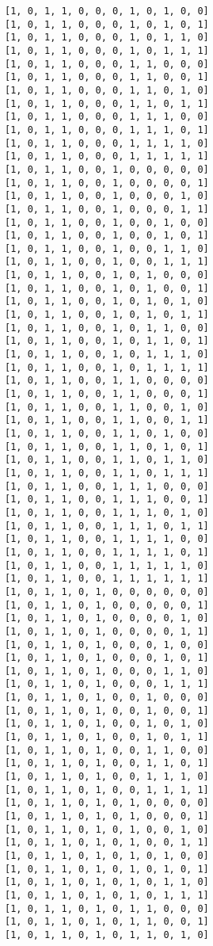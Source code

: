 \documentclass[11pt]{article}
\begin{document}
\begin{Verbatim}[commandchars=\\\{\}]
[1, 0, 1, 1, 0, 0, 0, 1, 0, 1, 0, 0]
[1, 0, 1, 1, 0, 0, 0, 1, 0, 1, 0, 1]
[1, 0, 1, 1, 0, 0, 0, 1, 0, 1, 1, 0]
[1, 0, 1, 1, 0, 0, 0, 1, 0, 1, 1, 1]
[1, 0, 1, 1, 0, 0, 0, 1, 1, 0, 0, 0]
[1, 0, 1, 1, 0, 0, 0, 1, 1, 0, 0, 1]
[1, 0, 1, 1, 0, 0, 0, 1, 1, 0, 1, 0]
[1, 0, 1, 1, 0, 0, 0, 1, 1, 0, 1, 1]
[1, 0, 1, 1, 0, 0, 0, 1, 1, 1, 0, 0]
[1, 0, 1, 1, 0, 0, 0, 1, 1, 1, 0, 1]
[1, 0, 1, 1, 0, 0, 0, 1, 1, 1, 1, 0]
[1, 0, 1, 1, 0, 0, 0, 1, 1, 1, 1, 1]
[1, 0, 1, 1, 0, 0, 1, 0, 0, 0, 0, 0]
[1, 0, 1, 1, 0, 0, 1, 0, 0, 0, 0, 1]
[1, 0, 1, 1, 0, 0, 1, 0, 0, 0, 1, 0]
[1, 0, 1, 1, 0, 0, 1, 0, 0, 0, 1, 1]
[1, 0, 1, 1, 0, 0, 1, 0, 0, 1, 0, 0]
[1, 0, 1, 1, 0, 0, 1, 0, 0, 1, 0, 1]
[1, 0, 1, 1, 0, 0, 1, 0, 0, 1, 1, 0]
[1, 0, 1, 1, 0, 0, 1, 0, 0, 1, 1, 1]
[1, 0, 1, 1, 0, 0, 1, 0, 1, 0, 0, 0]
[1, 0, 1, 1, 0, 0, 1, 0, 1, 0, 0, 1]
[1, 0, 1, 1, 0, 0, 1, 0, 1, 0, 1, 0]
[1, 0, 1, 1, 0, 0, 1, 0, 1, 0, 1, 1]
[1, 0, 1, 1, 0, 0, 1, 0, 1, 1, 0, 0]
[1, 0, 1, 1, 0, 0, 1, 0, 1, 1, 0, 1]
[1, 0, 1, 1, 0, 0, 1, 0, 1, 1, 1, 0]
[1, 0, 1, 1, 0, 0, 1, 0, 1, 1, 1, 1]
[1, 0, 1, 1, 0, 0, 1, 1, 0, 0, 0, 0]
[1, 0, 1, 1, 0, 0, 1, 1, 0, 0, 0, 1]
[1, 0, 1, 1, 0, 0, 1, 1, 0, 0, 1, 0]
[1, 0, 1, 1, 0, 0, 1, 1, 0, 0, 1, 1]
[1, 0, 1, 1, 0, 0, 1, 1, 0, 1, 0, 0]
[1, 0, 1, 1, 0, 0, 1, 1, 0, 1, 0, 1]
[1, 0, 1, 1, 0, 0, 1, 1, 0, 1, 1, 0]
[1, 0, 1, 1, 0, 0, 1, 1, 0, 1, 1, 1]
[1, 0, 1, 1, 0, 0, 1, 1, 1, 0, 0, 0]
[1, 0, 1, 1, 0, 0, 1, 1, 1, 0, 0, 1]
[1, 0, 1, 1, 0, 0, 1, 1, 1, 0, 1, 0]
[1, 0, 1, 1, 0, 0, 1, 1, 1, 0, 1, 1]
[1, 0, 1, 1, 0, 0, 1, 1, 1, 1, 0, 0]
[1, 0, 1, 1, 0, 0, 1, 1, 1, 1, 0, 1]
[1, 0, 1, 1, 0, 0, 1, 1, 1, 1, 1, 0]
[1, 0, 1, 1, 0, 0, 1, 1, 1, 1, 1, 1]
[1, 0, 1, 1, 0, 1, 0, 0, 0, 0, 0, 0]
[1, 0, 1, 1, 0, 1, 0, 0, 0, 0, 0, 1]
[1, 0, 1, 1, 0, 1, 0, 0, 0, 0, 1, 0]
[1, 0, 1, 1, 0, 1, 0, 0, 0, 0, 1, 1]
[1, 0, 1, 1, 0, 1, 0, 0, 0, 1, 0, 0]
[1, 0, 1, 1, 0, 1, 0, 0, 0, 1, 0, 1]
[1, 0, 1, 1, 0, 1, 0, 0, 0, 1, 1, 0]
[1, 0, 1, 1, 0, 1, 0, 0, 0, 1, 1, 1]
[1, 0, 1, 1, 0, 1, 0, 0, 1, 0, 0, 0]
[1, 0, 1, 1, 0, 1, 0, 0, 1, 0, 0, 1]
[1, 0, 1, 1, 0, 1, 0, 0, 1, 0, 1, 0]
[1, 0, 1, 1, 0, 1, 0, 0, 1, 0, 1, 1]
[1, 0, 1, 1, 0, 1, 0, 0, 1, 1, 0, 0]
[1, 0, 1, 1, 0, 1, 0, 0, 1, 1, 0, 1]
[1, 0, 1, 1, 0, 1, 0, 0, 1, 1, 1, 0]
[1, 0, 1, 1, 0, 1, 0, 0, 1, 1, 1, 1]
[1, 0, 1, 1, 0, 1, 0, 1, 0, 0, 0, 0]
[1, 0, 1, 1, 0, 1, 0, 1, 0, 0, 0, 1]
[1, 0, 1, 1, 0, 1, 0, 1, 0, 0, 1, 0]
[1, 0, 1, 1, 0, 1, 0, 1, 0, 0, 1, 1]
[1, 0, 1, 1, 0, 1, 0, 1, 0, 1, 0, 0]
[1, 0, 1, 1, 0, 1, 0, 1, 0, 1, 0, 1]
[1, 0, 1, 1, 0, 1, 0, 1, 0, 1, 1, 0]
[1, 0, 1, 1, 0, 1, 0, 1, 0, 1, 1, 1]
[1, 0, 1, 1, 0, 1, 0, 1, 1, 0, 0, 0]
[1, 0, 1, 1, 0, 1, 0, 1, 1, 0, 0, 1]
[1, 0, 1, 1, 0, 1, 0, 1, 1, 0, 1, 0]

\end{Verbatim}
\end{document}
